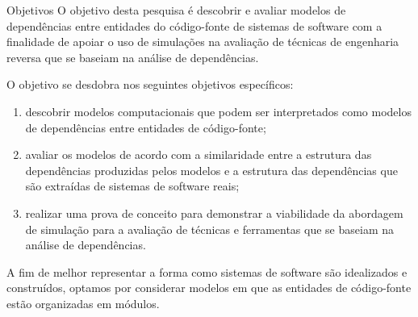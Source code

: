\begin{section}{Objetivos}
	O objetivo desta pesquisa é descobrir e avaliar modelos de dependências entre entidades do código-fonte de sistemas de software com a finalidade de apoiar o uso de simulações na avaliação de técnicas de engenharia reversa que se baseiam na análise de dependências.
	
	O objetivo se desdobra nos seguintes objetivos específicos:
	
	\begin{enumerate}
		\item descobrir modelos computacionais que podem ser interpretados como modelos de dependências entre entidades de código-fonte;
		\item avaliar os modelos de acordo com a similaridade entre a estrutura das dependências produzidas pelos modelos e a estrutura das dependências que são extraídas de sistemas de software reais;
		\item realizar uma prova de conceito para demonstrar a viabilidade da abordagem de simulação para a avaliação de técnicas e ferramentas que se baseiam na análise de dependências.
	\end{enumerate}
	
	A fim de melhor representar a forma como sistemas de software são idealizados e construídos, optamos por considerar modelos em que as entidades de código-fonte estão organizadas em módulos. %
	
\end{section}

